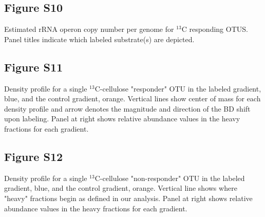 \subsection{Figure S10}
Estimated rRNA operon copy number per genome for $^{13}$C responding OTUS. Panel titles indicate which labeled substrate(s) are depicted.\subsection{Figure S11}
Density profile for a single $^{13}$C-cellulose "responder" OTU in the labeled gradient, blue, and the control gradient, orange. Vertical lines show center of mass for each density profile and arrow denotes the magnitude and direction of the BD shift upon labeling. Panel at right shows relative abundance values in the heavy fractions for each gradient. \subsection{Figure S12}
Density profile for a single $^{13}$C-cellulose "non-responder" OTU in the labeled gradient, blue, and the control gradient, orange. Vertical line shows where "heavy" fractions begin as defined in our analysis. Panel at right shows relative abundance values in the heavy fractions for each gradient.